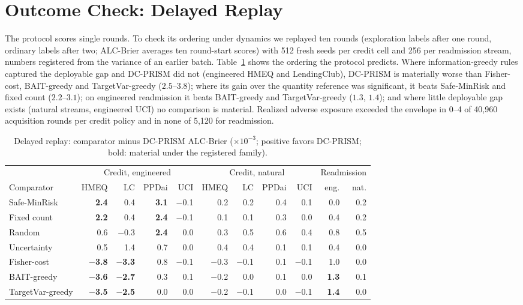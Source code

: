 \documentclass[runningheads]{llncs}
\begin{document}
\section{Outcome Check: Delayed Replay}
\label{sec:replay}
The protocol scores single rounds. To check its ordering under dynamics we replayed ten rounds (exploration labels after one round, ordinary labels after two; ALC-Brier averages ten round-start scores) with 512 fresh seeds per credit cell and 256 per readmission stream, numbers registered from the variance of an earlier batch. Table~\ref{tab:replay} shows the ordering the protocol predicts. Where information-greedy rules captured the deployable gap and DC-PRISM did not (engineered HMEQ and LendingClub), DC-PRISM is materially worse than Fisher-cost, BAIT-greedy and TargetVar-greedy ($2.5$--$3.8$); where its gain over the quantity reference was significant, it beats Safe-MinRisk and fixed count ($2.2$--$3.1$); on engineered readmission it beats BAIT-greedy and TargetVar-greedy ($1.3$, $1.4$); and where little deployable gap exists (natural streams, engineered UCI) no comparison is material. Realized adverse exposure exceeded the envelope in 0--4 of 40{,}960 acquisition rounds per credit policy and in none of 5{,}120 for readmission.

\begin{table}[t]
\caption{Delayed replay: comparator minus DC-PRISM ALC-Brier ($\times10^{-3}$; positive favors DC-PRISM; bold: material under the registered family).}
\label{tab:replay}
\centering\scriptsize
\setlength{\tabcolsep}{2.4pt}
\begin{tabular}{lrrrrrrrrrr}
\toprule
& \multicolumn{4}{c}{Credit, engineered} & \multicolumn{4}{c}{Credit, natural} & \multicolumn{2}{c}{Readmission} \\
\cmidrule(lr){2-5}\cmidrule(lr){6-9}\cmidrule(lr){10-11}
Comparator & HMEQ & LC & PPDai & UCI & HMEQ & LC & PPDai & UCI & eng. & nat. \\
\midrule
Safe-MinRisk & \textbf{2.4} & 0.4 & \textbf{3.1} & $-$0.1 & 0.2 & 0.2 & 0.4 & 0.1 & 0.0 & 0.2 \\
Fixed count & \textbf{2.2} & 0.4 & \textbf{2.4} & $-$0.1 & 0.1 & 0.1 & 0.3 & 0.0 & 0.4 & 0.2 \\
Random & 0.6 & $-$0.3 & \textbf{2.4} & 0.0 & 0.3 & 0.5 & 0.6 & 0.4 & 0.8 & 0.5 \\
Uncertainty & 0.5 & 1.4 & 0.7 & 0.0 & 0.4 & 0.4 & 0.1 & 0.1 & 0.4 & 0.0 \\
Fisher-cost & \textbf{$-$3.8} & \textbf{$-$3.3} & 0.8 & $-$0.1 & $-$0.3 & $-$0.1 & 0.1 & $-$0.1 & 1.0 & 0.0 \\
BAIT-greedy & \textbf{$-$3.6} & \textbf{$-$2.7} & 0.3 & 0.1 & $-$0.2 & 0.0 & 0.1 & 0.0 & \textbf{1.3} & 0.1 \\
TargetVar-greedy & \textbf{$-$3.5} & \textbf{$-$2.5} & 0.0 & 0.0 & $-$0.2 & $-$0.1 & 0.0 & $-$0.1 & \textbf{1.4} & 0.0 \\
\bottomrule
\end{tabular}
\end{table}
\end{document}

